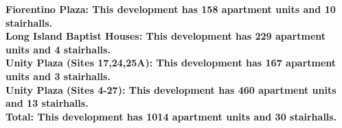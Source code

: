 \bf{Fiorentino Plaza}: This development has 158 apartment units and 10 stairhalls.\\\bf{Long Island Baptist Houses}: This development has 229 apartment units and 4 stairhalls.\\\bf{Unity Plaza (Sites 17,24,25A)}: This development has 167 apartment units and 3 stairhalls.\\\bf{Unity Plaza (Sites 4-27)}: This development has 460 apartment units and 13 stairhalls.\\\bf{Total}: This development has 1014 apartment units and 30 stairhalls.\\